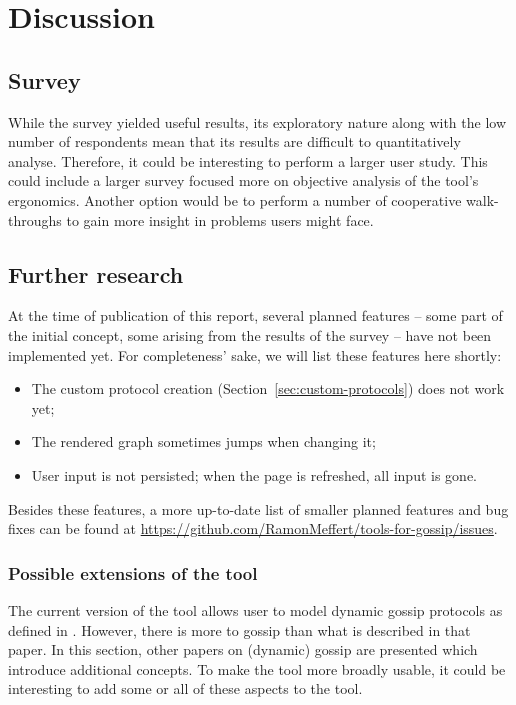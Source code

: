 
\section{Discussion}

\subsection{Survey}

While the survey yielded useful results, its exploratory nature along with the low number of respondents mean that its results are difficult to quantitatively analyse.
Therefore, it could be interesting to perform a larger user study.
This could include a larger survey focused more on objective analysis of the tool's ergonomics.
Another option would be to perform a number of cooperative walk-throughs to gain more insight in problems users might face.

\subsection{Further research}

At the time of publication of this report, several planned features -- some part of the initial concept, some arising from the results of the survey -- have not been implemented yet. For completeness' sake, we will list these features here shortly:

\begin{itemize}
    \item The custom protocol creation (Section~\ref{sec:custom-protocols}) does not work yet;
    \item The rendered graph sometimes jumps when changing it;
    \item User input is not persisted; when the page is refreshed, all input is gone.
\end{itemize}

Besides these features, a more up-to-date list of smaller planned features and bug fixes can be found at \url{https://github.com/RamonMeffert/tools-for-gossip/issues}.

\subsubsection{Possible extensions of the tool}

The current version of the tool allows user to model dynamic gossip protocols as defined in \textcite{van_ditmarsch_dynamic_2018}.
However, there is more to gossip than what is described in that paper.
In this section, other papers on (dynamic) gossip are presented which introduce additional concepts.
To make the tool more broadly usable, it could be interesting to add some or all of these aspects to the tool.

